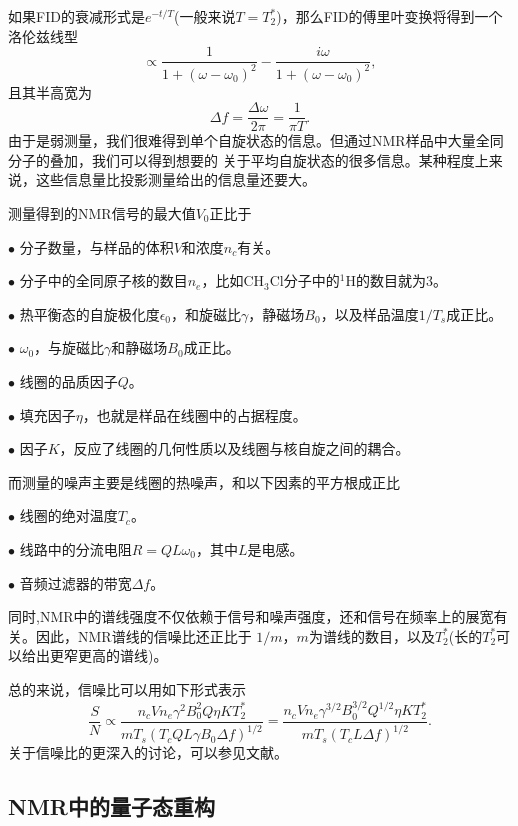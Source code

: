 如果FID的衰减形式是$e^{-t/T}$(一般来说$T = T_2^{*}$)，那么FID的傅里叶变换将得到一个洛伦兹线型
\begin{equation}\label{aaa}
\propto \frac{1}{1+(\omega-\omega_0)^2}- \frac{i\omega}{1+(\omega-\omega_0)^2},
\end{equation}
且其半高宽为
\begin{equation}\label{aaa}
\Delta f = \frac{\Delta \omega}{2\pi} = \frac{1}{\pi T}.
\end{equation}
由于是弱测量，我们很难得到单个自旋状态的信息。但通过NMR样品中大量全同分子的叠加，我们可以得到想要的
关于平均自旋状态的很多信息。某种程度上来说，这些信息量比投影测量给出的信息量还要大。

测量得到的NMR信号的最大值$V_0$正比于

$\bullet$ 分子数量，与样品的体积$V$和浓度$n_c$有关。

$\bullet$ 分子中的全同原子核的数目$n_e$，比如CH$_3$Cl分子中的$^1$H的数目就为3。

$\bullet$ 热平衡态的自旋极化度$\epsilon_0$，和旋磁比$\gamma$，静磁场$B_0$，以及样品温度$1/T_s$成正比。

$\bullet$ $\omega_0$，与旋磁比$\gamma$和静磁场$B_0$成正比。

$\bullet$ 线圈的品质因子$Q$。

$\bullet$ 填充因子$\eta$，也就是样品在线圈中的占据程度。

$\bullet$ 因子$K$，反应了线圈的几何性质以及线圈与核自旋之间的耦合。

而测量的噪声主要是线圈的热噪声，和以下因素的平方根成正比

$\bullet$ 线圈的绝对温度$T_c$。

$\bullet$ 线路中的分流电阻$R = QL\omega_0$，其中$L$是电感。

$\bullet$ 音频过滤器的带宽$\Delta f$。

同时,NMR中的谱线强度不仅依赖于信号和噪声强度，还和信号在频率上的展宽有关。因此，NMR谱线的信噪比还正比于
$1/m$，$m$为谱线的数目，以及$T_2^{*}$(长的$T_2^{*}$可以给出更窄更高的谱线)。

总的来说，信噪比可以用如下形式表示
\begin{equation}\label{aaa}
\frac{S}{N} \propto \frac{n_cVn_e\gamma^2B_0^2Q\eta KT_2^{*}}{mT_s(T_cQL\gamma B_0\Delta f)^{1/2}} = \frac{n_cVn_e\gamma^{3/2}B_0^{3/2}Q^{1/2}\eta KT_2^{*}}{mT_s(T_cL\Delta f)^{1/2}} .
\end{equation}
关于信噪比的更深入的讨论，可以参见文献\cite{snr1}。

\subsection{NMR中的量子态重构}

